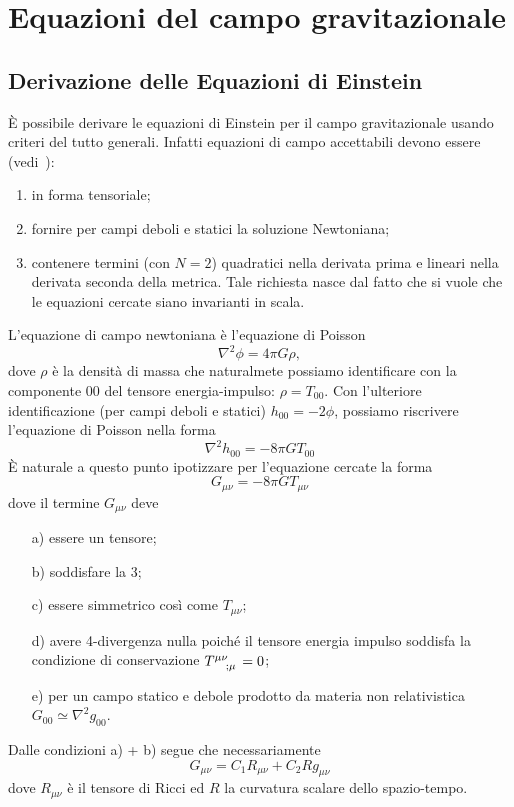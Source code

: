 \cleardoublepage

\chapter{Equazioni del campo gravitazionale}
\label{cha:equazioni-campo-grav}

\section{Derivazione delle Equazioni di Einstein}

È possibile derivare le equazioni di Einstein per il campo gravitazionale usando
criteri del tutto generali.  Infatti equazioni di campo accettabili devono
essere (vedi~\textcite[151]{weinberg:gravitation}):
\begin{enumerate}
\item in forma tensoriale;
\item fornire per campi deboli e statici la soluzione Newtoniana;
\item contenere termini (con $N=2$) quadratici nella derivata prima e lineari
  nella derivata seconda della metrica.  Tale richiesta nasce dal fatto che si
  vuole che le equazioni cercate siano invarianti in scala.
\end{enumerate}
L'equazione di campo newtoniana è l'equazione di Poisson
\begin{equation}
  \nabla^2 \phi = 4 \pi G \rho,
\end{equation}
dove $\rho$ è la densità di massa che naturalmete possiamo identificare con la
componente $00$ del tensore energia-impulso: $\rho = T_{00}$.  Con l'ulteriore
identificazione (per campi deboli e statici) $h_{00} = - 2 \phi$, possiamo
riscrivere l'equazione di Poisson nella forma
\begin{equation}
  \nabla^2 h_{00} = - 8 \pi G T_{00}
\end{equation}
È naturale a questo punto ipotizzare per l'equazione cercate la forma
\begin{equation}
  G_{\mu \nu} = - 8 \pi G T_{\mu \nu}
\end{equation}
dove il termine $G_{\mu \nu}$ deve
\begin{itemize}
\item[a)] essere un tensore;
\item[b)] soddisfare la 3;
\item[c)] essere simmetrico così come $T_{\mu \nu}$;
\item[d)] avere 4-divergenza nulla poiché il tensore energia impulso soddisfa la
  condizione di conservazione $\tensor{T}{^{\mu \nu}_{; \mu}} =0$;
\item[e)] per un campo statico e debole prodotto da materia non relativistica
  $G_{00} \simeq \nabla^2 g_{00}$.
\end{itemize}
Dalle condizioni a) + b) segue che necessariamente
\begin{equation}
  G_{\mu \nu} = C_1 R_{\mu \nu} + C_2 R g_{\mu \nu}
\end{equation}
dove $R_{\mu \nu}$ è il tensore di Ricci ed $R$ la curvatura scalare dello
spazio-tempo.

